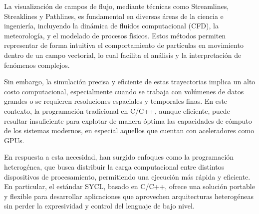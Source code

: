 \documentclass[12pt]{article}
\begin{document}
La visualización de campos de flujo, mediante técnicas como Streamlines, Streaklines y Pathlines, es fundamental en diversas áreas de la ciencia e ingeniería, incluyendo la dinámica de fluidos computacional (CFD), la meteorología, y el modelado de procesos físicos. Estos métodos permiten representar de forma intuitiva el comportamiento de partículas en movimiento dentro de un campo vectorial, lo cual facilita el análisis y la interpretación de fenómenos complejos.



Sin embargo, la simulación precisa y eficiente de estas trayectorias implica un alto costo computacional, especialmente cuando se trabaja con volúmenes de datos grandes o se requieren resoluciones espaciales y temporales finas. En este contexto, la programación tradicional en C/C++, aunque eficiente, puede resultar insuficiente para explotar de manera óptima las capacidades de cómputo de los sistemas modernos, en especial aquellos que cuentan con aceleradores como GPUs.



En respuesta a esta necesidad, han surgido enfoques como la programación heterogénea, que busca distribuir la carga computacional entre distintos dispositivos de procesamiento, permitiendo una ejecución más rápida y eficiente. En particular, el estándar SYCL, basado en C/C++, ofrece una solución portable y flexible para desarrollar aplicaciones que aprovechen arquitecturas heterogéneas sin perder la expresividad y control del lenguaje de bajo nivel.
\end{document}
